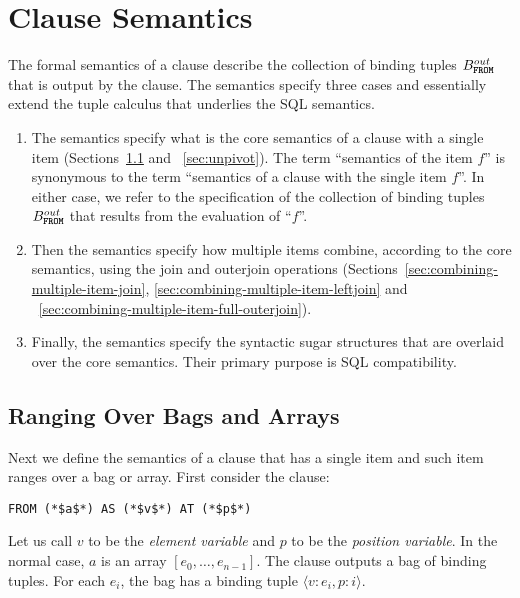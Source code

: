 \section{\from Clause Semantics}
\label{sec:from}

The formal semantics of a \from clause describe the collection of binding
tuples $B^{out}_{\texttt{\textbf{FROM}}}$ that is output by the \from clause. The semantics
specify three cases and essentially extend the tuple calculus that underlies the
SQL semantics.

\begin{enumerate}
\item The semantics specify what is the core semantics of a \from clause with a
single \from item (Sections~\ref{sec:single-item-from} and ~\ref{sec:unpivot}).
The term ``semantics of the \from item $f$'' is synonymous to the term
``semantics of a \from clause with the single item $f$''. In either case, we
refer to the specification of the collection of binding tuples $B^{out}_{\texttt{\textbf{FROM}}}$
that results from the evaluation of ``\from $f$''.

\item Then the semantics specify how multiple \from items combine, according to
the core semantics, using the join and outerjoin operations
(Sections~\ref{sec:combining-multiple-item-join},
\ref{sec:combining-multiple-item-leftjoin} and
~\ref{sec:combining-multiple-item-full-outerjoin}). 

\item Finally, the semantics specify the syntactic sugar structures that are
overlaid over the core semantics. Their primary purpose is SQL compatibility.
\end{enumerate}


\subsection{Ranging Over Bags and Arrays}
\label{sec:single-item-from}

Next we define the semantics of a \from clause that has a single \from item
and such item ranges over a bag or array. First consider the \from clause:

\begin{lstlisting}
FROM (*$a$*) AS (*$v$*) AT (*$p$*)
\end{lstlisting}

\noindent Let us call $v$ to be the \emph{element variable} and $p$ to be the
\emph{position variable}. In the normal case, $a$ is an array $[ e_0, \ldots,
e_{n-1} ]$. The \from clause outputs a bag of binding tuples. For each $e_i$,
the bag has a binding tuple $\langle v: e_i, p:i \rangle$.

